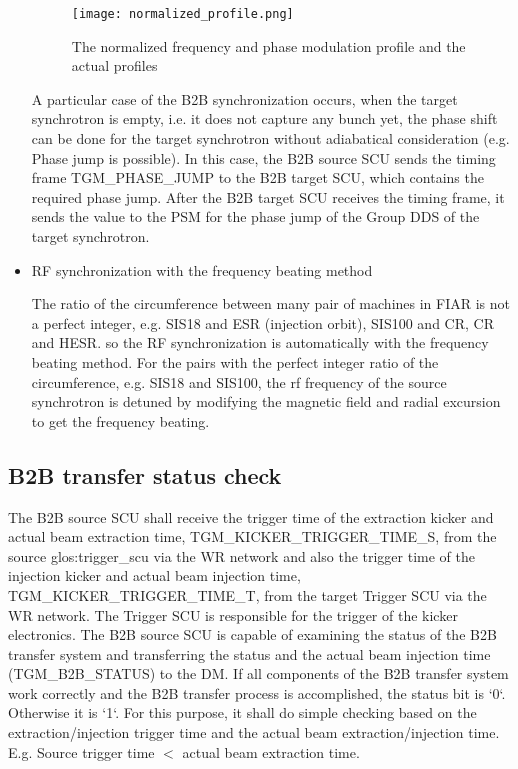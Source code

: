 \begin{itemize}
\begin{figure}[!htb]
   \centering   
   \texttt{[image: normalized\_profile.png]}
   \caption{The normalized frequency and phase modulation profile and the actual profiles}
   \label{normalized_profile}
\end{figure}  

A particular case of the B2B synchronization occurs, when the target synchrotron is empty, i.e. it does not capture any bunch yet, the phase shift can be done for the target synchrotron without adiabatical consideration (e.g. Phase jump is possible). In this case, the B2B source SCU sends the timing frame TGM\_PHASE\_JUMP to the B2B target SCU, which contains the required phase jump. After the B2B target SCU receives the timing frame, it sends the value to the PSM for the phase jump of the Group DDS of the target synchrotron. 

\item RF synchronization with the frequency beating method

The ratio of the circumference between many pair of machines in FIAR is not a perfect integer, e.g. SIS18 and ESR (injection orbit), SIS100 and CR, CR and HESR. so the RF synchronization is automatically with the frequency beating method. For the pairs with the perfect integer ratio of the circumference, e.g. SIS18 and SIS100, the rf frequency of the source synchrotron is detuned by modifying the magnetic field and radial excursion to get the frequency beating.

\end{itemize}

\subsection{B2B transfer status check}
The B2B source SCU shall receive the trigger time of the extraction kicker and actual beam extraction time, TGM\_KICKER\_TRIGGER\_TIME\_S, from the source \gls{glos:trigger_scu} via the WR network and also the trigger time of the injection kicker and actual beam injection time, TGM\_KICKER\_TRIGGER\_TIME\_T, from the target Trigger SCU via the WR network. The Trigger SCU is responsible for the trigger of the kicker electronics. The B2B source SCU is capable of examining the status of the B2B transfer system and transferring the status and the actual beam injection time  (TGM\_B2B\_STATUS) to the DM. If all components of the B2B transfer system work correctly and the B2B transfer process is accomplished, the status bit is `0`. Otherwise it is `1`. For this purpose, it shall do simple checking based on the extraction/injection trigger time and the actual beam extraction/injection time. E.g. Source trigger time $<$ actual beam extraction time.


